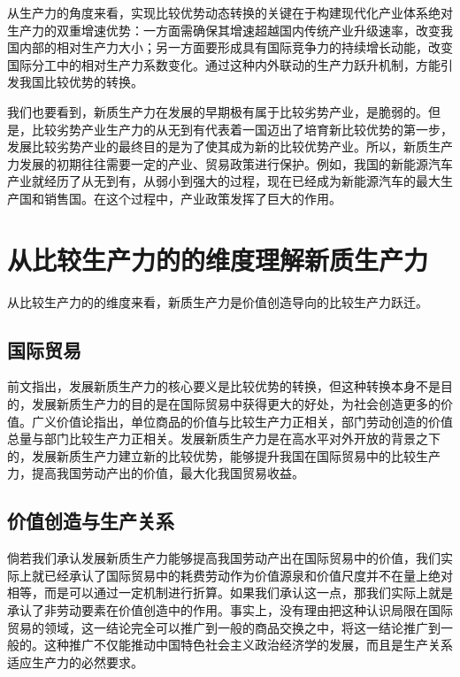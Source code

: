 从生产力的角度来看，实现比较优势动态转换的关键在于构建现代化产业体系绝对生产力的双重增速优势：一方面需确保其增速超越国内传统产业升级速率，改变我国内部的相对生产力大小；另一方面要形成具有国际竞争力的持续增长动能，改变国际分工中的相对生产力系数变化。通过这种内外联动的生产力跃升机制，方能引发我国比较优势的转换。

我们也要看到，新质生产力在发展的早期极有属于比较劣势产业，是脆弱的。但是，比较劣势产业生产力的从无到有代表着一国迈出了培育新比较优势的第一步\cite[70]{LiuLeYiJingTaiBiJiaoYouShiDongTaiHuaDeQuDongLiYuLiShiJingYanJianLunFaZhanXinZhiShengChanLiYuTiShengChanYeLianGongYingLianRenXingNeiYin2025}，发展比较劣势产业的最终目的是为了使其成为新的比较优势产业。所以，新质生产力发展的初期往往需要一定的产业、贸易政策进行保护。例如，我国的新能源汽车产业就经历了从无到有，从弱小到强大的过程，现在已经成为新能源汽车的最大生产国和销售国。在这个过程中，产业政策发挥了巨大的作用。\cite{WangMingHeWoGuoXinNengYuanQiCheChanYeZhengCeYanJiu2023}

\section{从比较生产力的的维度理解新质生产力}

从比较生产力的的维度来看，新质生产力是价值创造导向的比较生产力跃迁。

\subsection{国际贸易}

前文指出，发展新质生产力的核心要义是比较优势的转换，但这种转换本身不是目的，发展新质生产力的目的是在国际贸易中获得更大的好处，为社会创造更多的价值。广义价值论指出，单位商品的价值与比较生产力正相关，部门劳动创造的价值总量与部门比较生产力正相关。发展新质生产力是在高水平对外开放的背景之下的\cite[518]{XiJinPingXiJinPingJingJiWenXuanDiYiJuan2025}，发展新质生产力建立新的比较优势，能够提升我国在国际贸易中的比较生产力，提高我国劳动产出的价值，最大化我国贸易收益\cite[76]{LiuLeYiJingTaiBiJiaoYouShiDongTaiHuaDeQuDongLiYuLiShiJingYanJianLunFaZhanXinZhiShengChanLiYuTiShengChanYeLianGongYingLianRenXingNeiYin2025}。

\subsection{价值创造与生产关系}

倘若我们承认发展新质生产力能够提高我国劳动产出在国际贸易中的价值，我们实际上就已经承认了国际贸易中的耗费劳动作为价值源泉和价值尺度并不在量上绝对相等，而是可以通过一定机制进行折算。如果我们承认这一点，那我们实际上就是承认了非劳动要素在价值创造中的作用。事实上，没有理由把这种认识局限在国际贸易的领域，这一结论完全可以推广到一般的商品交换之中，将这一结论推广到一般的。这种推广不仅能推动中国特色社会主义政治经济学的发展，而且是生产关系适应生产力的必然要求。

